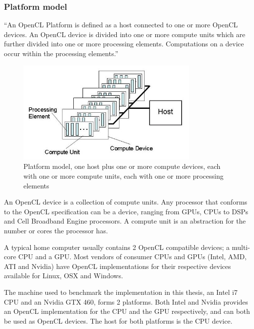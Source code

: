 \subsubsection{Platform model}

``An OpenCL Platform is defined as a host connected to one or more
OpenCL devices. An OpenCL device is divided into one or more compute
units which are further divided into one or more processing elements.
Computations on a device occur within the processing elements.''
\cite{cl-spec}

\begin{figure}
  \centering
  \includegraphics[width=0.8\textwidth]{images/platform-model.png}
  \caption{Platform model, one host plus one or more compute devices,
    each with one or more compute units, each with one or more
    processing elements}
  \label{platform-model-figure}
\end{figure}

An OpenCL device is a collection of compute units. Any processor that
conforms to the OpenCL specification can be a device, ranging from
GPUs, CPUs to DSPs and Cell Broadband Engine processors. A compute
unit is an abstraction for the number or cores the processor has.

A typical home computer usually contains 2 OpenCL compatible devices;
a multi-core CPU and a GPU. Most vendors of consumer CPUs and GPUs
(Intel, AMD, ATI and Nvidia) have OpenCL implementations for their
respective devices available for Linux, OSX and Windows.

The machine used to benchmark the implementation in this thesis, an
Intel i7 CPU and an Nvidia GTX 460, forms 2 platforms. Both Intel and
Nvidia provides an OpenCL implementation for the CPU and the GPU
respectively, and can both be used as OpenCL devices. The host for
both platforms is the CPU device.

